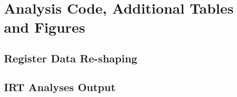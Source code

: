 \section{Analysis Code, Additional Tables and Figures}\label{app}

\subsection{Register Data Re-shaping}

\begin{singlespacing}
    
\end{singlespacing}

\subsection{IRT Analyses Output}



